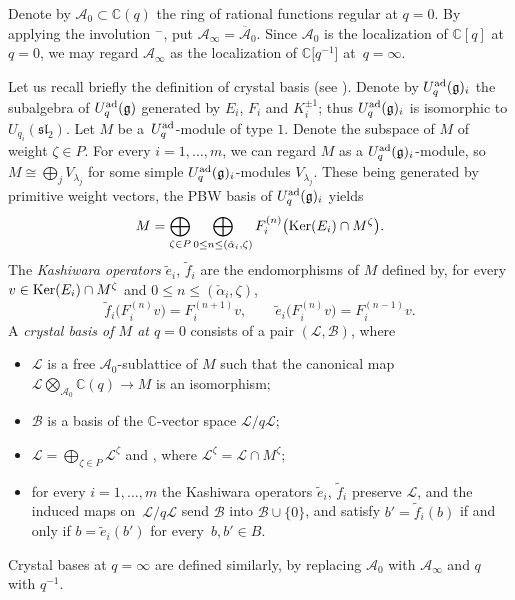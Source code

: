 \documentclass[10pt,a4paper]{amsart}
\numberwithin{equation}{section}
\theoremstyle{definition}
\newcommand{\mc}{\mathbb{C}}
\newcommand{\Ll}{{\mathcal L}}
\newcommand{\ra}{\rightarrow}
\begin{document}
Denote by $\mathcal{A}_0\subset \mc(q)$ the ring of rational functions regular at $q=0$. By applying the involution ${}^-$, put $\mathcal{A}_\infty=\overline{\mathcal{A}}_0$.
Since $\mathcal{A}_0$ is the localization of $\mc[q]$ at $q=0$, we may regard $\mathcal{A}_\infty$ as the localization of $\mc\big[q^{-1}\big]$ at~${q=\infty}$.

Let us recall briefly the definition of crystal basis (see \cite{Kashiwara1}). Denote by $U_q^{\rm ad}(\mathfrak{g})_i$ the subalgebra of $U_q^{\rm ad}(\mathfrak{g})$ generated by $E_i$, $F_i$ and $K_i^{\pm 1}$; thus $U_q^{\rm ad}(\mathfrak{g})_i$ is isomorphic to $U_{q_i}({\mathfrak{sl}_2})$. Let $M$ be a~$U_q^{\rm ad}$-module of type $1$. Denote  the subspace of $M$ of weight $\zeta\in P$. For every $i=1,\dots, m$, we can regard $M$ as a $U_q^{\rm ad}(\mathfrak{g})_i$-module, so $M\cong \bigoplus_j V_{\lambda_j}$ for some simple $U_q^{\rm ad}(\mathfrak{g})_i$-modules $V_{\lambda_j}$. These being generated by primitive weight vectors, the PBW basis of $U_q^{\rm ad}(\mathfrak{g})_i$ yields
\[M = \bigoplus_{\zeta\in P} \bigoplus_{0\leq n\leq (\check{\alpha}_i, \zeta)} F_i^{(n)}\big({\rm Ker}(E_i)\cap M^\zeta\big).\]
The {\it Kashiwara operators} $\tilde{e}_i$, $\tilde{f}_i$ are the endomorphisms of $M$ defined by, for every $v\in {\rm Ker}(E_i)\cap M^\zeta$ and $0\leq n\leq (\check{\alpha}_i, \zeta)$,
\[%
\tilde{f}_i\big(F_i^{(n)}v\big) = F_i^{(n+1)}v,\qquad \tilde{e}_i\big(F_i^{(n)}v\big) = F_i^{(n-1)}v.
\]
A {\it crystal basis of $M$ at $q=0$} consists of a pair $(\Ll, \mathcal{B})$, where
\begin{itemize}\itemsep=0pt
\item $\Ll$ is a free $\mathcal{A}_0$-sublattice of $M$ such that the canonical map $\Ll \bigotimes_{\mathcal{A}_0} \mc(q) \ra M$ is an isomorphism;
\item $\mathcal{B}$ is a basis of the $\mc$-vector space $\Ll/q\Ll$;
\item $ \Ll = \bigoplus_{\zeta \in P} \Ll^\zeta$ and \smash{$\mathcal{B} = \coprod_{\zeta \in P} \big(\mathcal{B}\cap \Ll^\zeta/q\Ll^\zeta\big)$}, where $\Ll^\zeta = \Ll\cap M^\zeta$;
\item for every $i=1,\dots, m$ the Kashiwara operators $\tilde{e}_i$, $\tilde{f}_i$ preserve $\Ll$, and the induced maps on~$\Ll/q\Ll$ send $\mathcal{B}$ into $\mathcal{B}\cup \{0\}$, and satisfy $b' = \tilde{f}_i(b)$ if and only if $b=\tilde{e}_i(b')$ for every~${b,b'\in B}$.
\end{itemize}
Crystal bases at $q=\infty$ are defined similarly, by replacing $\mathcal{A}_0$ with $\mathcal{A}_\infty$ and $q$ with $q^{-1}$.
\end{document}
